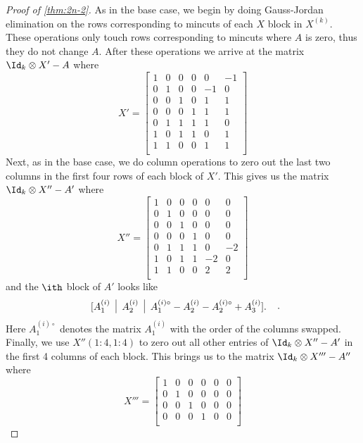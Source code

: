 \begin{proof}[Proof of \cref{thm:2n-2}]
As in the base case, we begin by doing Gauss-Jordan elimination on the rows corresponding to mincuts of each $X$ block in $X^{(k)}$.  These operations
only touch rows corresponding to mincuts where $A$ is zero, thus they do not change $A$.  After these operations we arrive at the matrix $\Id_k \otimes X' - A$
where
\[
X' =
\begin{bmatrix}
1 &  0 &  0 &  0 &  0 & -1 \\
0 &  1 &  0 &  0 & -1 &  0 \\
0 &  0 &  1 &  0 &  1 &  1 \\
0 &  0 &  0 &  1 &  1 &  1 \\
0 &  1 &  1 &  1 &  1 &  0 \\
1 &  0 &  1 &  1 &  0 &  1 \\
1 &  1 &  0 &  0 &  1 &  1 \\
\end{bmatrix}
\]
Next, as in the base case, we do column operations to zero out the last two columns in the first four rows of each block of $X'$.  This
gives us the matrix $\Id_k \otimes X'' - A'$ where
\[
X'' =
\begin{bmatrix}
1 &  0 &  0 &  0 &  0 & 0 \\
0 &  1 &  0 &  0 & 0 &  0 \\
0 &  0 &  1 &  0 &  0 &  0 \\
0 &  0 &  0 &  1 &  0 &  0 \\
0 &  1 &  1 &  1 &  0 &  -2 \\
1 &  0 &  1 &  1 &  -2 &  0 \\
1 &  1 &  0 &  0 &  2 &  2 \\
\end{bmatrix}
\]
and the $\ith$ block of $A'$ looks like
\[
\begin{tabular}{c|c|c}
$[A_1^{(i)}$ & $A_2^{(i)}$ & $A_1^{(i)\circ} -A_2^{(i)} - A_2^{(i)\circ} + A_3^{(i)}] .$
\end{tabular}
\enspace.
\]
Here $A_1^{(i)\circ}$ denotes the matrix $A_1^{(i)}$ with the order of the columns swapped.
Finally, we use $X''(1:4,1:4)$ to zero out all other entries of $\Id_k \otimes X'' - A'$ in the first 4 columns of each block.
This brings us to the matrix $\Id_k \otimes X''' - A''$ where
\[
X''' =
\begin{bmatrix}
1 &  0 &  0 &  0 &  0 & 0 \\
0 &  1 &  0 &  0 & 0 &  0 \\
0 &  0 &  1 &  0 &  0 &  0 \\
0 &  0 &  0 &  1 &  0 &  0 \\

\end{bmatrix}\]
\end{proof}
